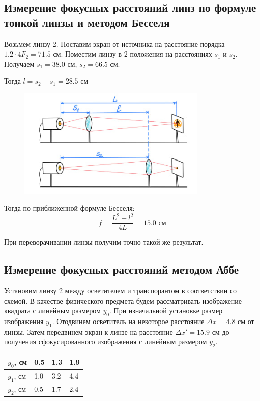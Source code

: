 \documentclass[a4paper,12pt]{article}
\theoremstyle{definition}
\begin{document}
\subsection{Измерение фокусных расстояний линз по формуле тонкой линзы и
методом Бесселя}

Возьмем линзу 2. Поставим экран от источника на расстояние  порядка $1.2 \cdot 4 F_2 = 71.5$ см.
Поместим линзу в 2 положения на расстояниях $s_1$ и $s_2$. Получаем $s_1 = 38.0$ см, $s_2 = 66.5$ см.
\par Тогда $l = s_2 - s_1 = 28.5$ см

\begin{figure}[h!]
    \centering
    \includegraphics[width=9cm]{r.jpg}
    \label{fig:vac}
\end{figure}

Тогда по приближенной формуле Бесселя:
\begin{equation*}
    f = \frac{L^2-l^2}{4L} = 15.0 \text{ см}
\end{equation*}

При переворачивании линзы получим точно такой же результат.



\subsection{Измерение фокусных расстояний методом Аббе}

Установим линзу 2 между осветителем и транспорантом в соответствии со схемой. В качестве физического предмета будем рассматривать изображение квадрата с линейным размером $y_0$.
При изначальной установке размер изображения $y_1$. Отодвинем осветитель на некоторое расстояние $\Delta x = 4.8$ см от линзы. Затем передвинем экран к линзе на расстояние $\Delta x' = 15.9$ см до
получения сфокусированного изображения с линейным размером $y_2$.

\begin{table}[h!]
    \centering
    \begin{tabular}{|l|l|l|l|} \hline
    $y_0$, см  & 0.5 & 1.3 & 1.9  \\ \hline
    $y_1$, см  & 1.0 & 3.2 & 4.4  \\ \hline
    $y_2$, см  & 0.5 & 1.7 & 2.4  \\ \hline
    \end{tabular}
\end{table}
\end{document}
